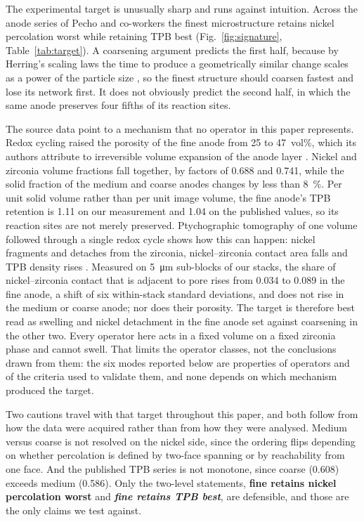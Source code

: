 \documentclass[5p,times,twocolumn]{elsarticle}
\begin{document}
The experimental target is unusually sharp and runs against intuition. Across
the anode series of Pecho and co-workers \cite{pecho2015transport,pecho2015tpb}
the finest microstructure retains nickel percolation worst while
retaining TPB best (Fig.~\ref{fig:signature}, Table~\ref{tab:target}).
A coarsening argument predicts the first half, because by Herring's scaling
laws the
time to produce a geometrically similar change scales as a power of the
particle size \cite{herring1950}, so the finest structure should coarsen
fastest and lose its network first. It does not obviously predict the second
half, in which the same anode preserves four fifths of its reaction sites.

The source data point to a mechanism that no operator in this paper
represents. Redox cycling raised the porosity of the fine anode from 25 to
47~vol\%, which its authors attribute to irreversible volume expansion of the
anode layer \cite{pecho2015transport,pecho2015tpb}. Nickel and zirconia volume
fractions fall together, by factors of 0.688 and 0.741, while the solid
fraction of the medium and coarse anodes changes by less than
\SI{8}{\percent}. Per unit solid volume rather than per unit image volume, the
fine anode's TPB retention is 1.11 on our measurement and 1.04 on the
published values, so its reaction sites are not merely preserved.
Ptychographic tomography of one volume followed through a single redox cycle
shows how this can happen: nickel fragments and detaches from the zirconia,
nickel--zirconia contact area falls and TPB density rises \cite{deangelis2017}.
Measured on \SI{5}{\micro\metre} sub-blocks of our stacks, the share of
nickel--zirconia contact that is adjacent to pore rises from 0.034 to 0.089 in
the fine anode, a shift of six within-stack standard deviations, and does not
rise in the medium or coarse anode; nor does their porosity. The target is
therefore best read as swelling and nickel detachment in the fine anode set
against coarsening in the other two. Every operator here acts in a fixed
volume on a fixed zirconia phase and cannot swell. That limits the operator
classes, not the conclusions drawn from them: the six modes reported below are
properties of operators and of the criteria used to validate them, and none
depends on which mechanism produced the target.

Two cautions travel with that target throughout this paper, and both follow
from how the data were acquired rather than from how they were analysed.
Medium versus coarse is not resolved on the nickel side, since the ordering
flips
depending on whether percolation is defined by two-face spanning or by
reachability from one face. And the published TPB series is not monotone,
since coarse (0.608) exceeds medium (0.586). Only the two-level statements,
\textbf{fine retains nickel percolation worst} and \emph{\textbf{fine retains TPB best}}, are defensible, and those are the only claims we test against.
\end{document}
